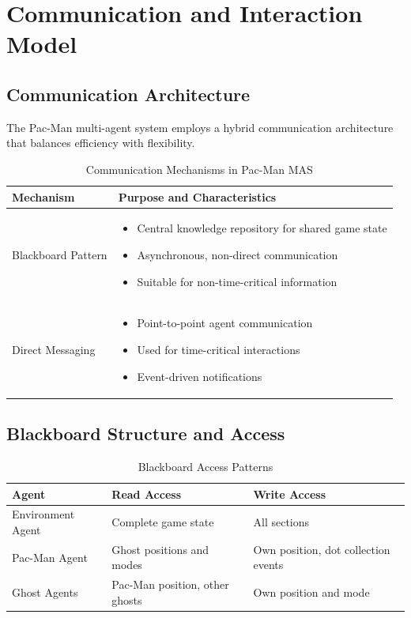 \documentclass[a4paper, 11pt]{article}
\begin{document}
\section{Communication and Interaction Model}

\subsection{Communication Architecture}
The Pac-Man multi-agent system employs a hybrid communication architecture that balances efficiency with flexibility.

\begin{table}[h]
\centering
\caption{Communication Mechanisms in Pac-Man MAS}
\begin{tabular}{|p{3.5cm}|p{10.5cm}|}
\hline
\textbf{Mechanism} & \textbf{Purpose and Characteristics} \\
\hline
Blackboard Pattern & 
\begin{itemize}
    \item Central knowledge repository for shared game state
    \item Asynchronous, non-direct communication
    \item Suitable for non-time-critical information
\end{itemize} \\
\hline
Direct Messaging & 
\begin{itemize}
    \item Point-to-point agent communication
    \item Used for time-critical interactions
    \item Event-driven notifications
\end{itemize} \\
\hline
\end{tabular}
\end{table}

\clearpage
\subsection{Blackboard Structure and Access}

\begin{table}[h]
\centering
\caption{Blackboard Access Patterns}
\begin{tabular}{|p{3cm}|p{5.5cm}|p{5.5cm}|}
\hline
\textbf{Agent} & \textbf{Read Access} & \textbf{Write Access} \\
\hline
Environment Agent & Complete game state & All sections \\
\hline
Pac-Man Agent & Ghost positions and modes & Own position, dot collection events \\
\hline
Ghost Agents & Pac-Man position, other ghosts & Own position and mode \\
\hline
\end{tabular}
\end{table}
\end{document}
